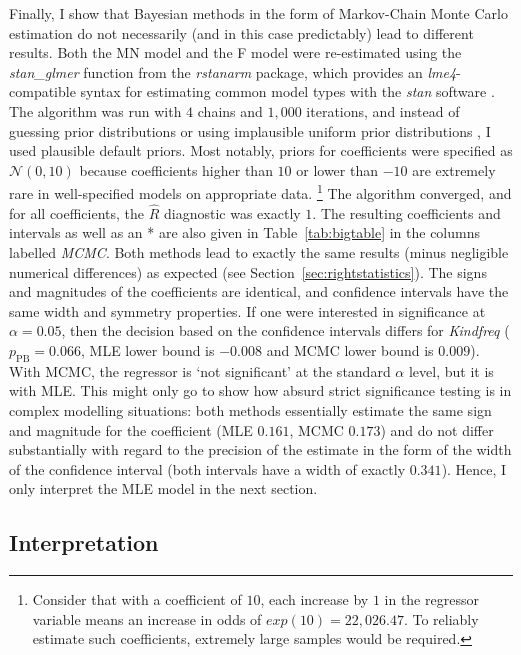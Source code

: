\documentclass[USenglish]{article}
\begin{document}
Finally, I show that Bayesian methods in the form of Markov-Chain Monte Carlo estimation do not necessarily (and in this case predictably) lead to different results.
Both the MN model and the F model were re-estimated using the \textit{stan\_glmer} function from the \textit{rstanarm} package, which provides an \textit{lme4}-compatible syntax for estimating common model types with the \textit{stan} software \citep{CarpenterEa2017}.
The algorithm was run with $4$ chains and $1,000$ iterations, and instead of guessing prior distributions or using implausible uniform prior distributions \cite[251--252]{Levshina2016}, I used plausible default priors.
Most notably, priors for coefficients were specified as $\mathcal{N}(0,10)$ because coefficients higher than $10$ or lower than $-10$ are extremely rare in well-specified models on appropriate data.%
\footnote{Consider that with a coefficient of $10$, each increase by $1$ in the regressor variable means an increase in odds of $exp(10)=22,026.47$.
To reliably estimate such coefficients, extremely large samples would be required.}
The algorithm converged, and for all coefficients, the $\hat{R}$ diagnostic was exactly $1$.
The resulting coefficients and intervals as well as an * are also given in Table~\ref{tab:bigtable} in the columns labelled \textit{MCMC}.
Both methods lead to exactly the same results (minus negligible numerical differences) as expected (see Section~\ref{sec:rightstatistics}).
The signs and magnitudes of the coefficients are identical, and confidence intervals have the same width and symmetry properties.
If one were interested in significance at $\alpha=0.05$, then the decision based on the confidence intervals differs for \textit{Kindfreq} ($p_{\text{PB}}=0.066$, MLE lower bound is $-0.008$ and MCMC lower bound is $0.009$).
With MCMC, the regressor is `not significant' at the standard $\alpha$ level, but it is with MLE.
This might only go to show how absurd strict significance testing is in complex modelling situations:
both methods essentially estimate the same sign and magnitude for the coefficient (MLE $0.161$, MCMC $0.173$) and do not differ substantially with regard to the precision of the estimate in the form of the width of the confidence interval (both intervals have a width of exactly $0.341$).
Hence, I only interpret the MLE model in the next section.




\subsection{Interpretation}
\label{sec:interpretation}
\end{document}
